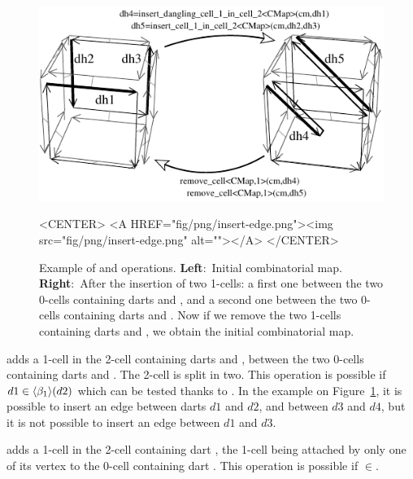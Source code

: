 \begin{figure}[htb]
  \begin{ccTexOnly}
    \begin{center}
      \includegraphics[width=.72\textwidth]{Combinatorial_map/fig/pdf/insert-edge}
    \end{center}
  \end{ccTexOnly}
  \begin{ccHtmlOnly}
    <CENTER> <A HREF="fig/png/insert-edge.png"><img
    src="fig/png/insert-edge.png" alt=""></A> </CENTER>
  \end{ccHtmlOnly}
  \caption{Example of  and
     operations. \textbf{Left}:~Initial
    combinatorial map.  \textbf{Right}:~After the insertion of two
    1-cells: a first one between the two 0-cells containing darts
     and , and a second one between the two 0-cells
    containing darts  and . Now if we remove the two
    1-cells containing darts  and , we obtain the
    initial combinatorial map.}
  \label{fig-insert-edge}
\end{figure}
{} adds a 1-cell in
the 2-cell containing darts  and , between the two
0-cells containing darts  and . The 2-cell is split
in two. This operation is possible if $d1 \in \langle{}\beta_1\rangle{}(d2)$
which can be tested thanks to
.  In the example on
Figure~\ref{fig-insert-edge}, it is possible to insert an edge
between darts $d1$ and $d2$, and between $d3$ and $d4$, but it is
not possible to insert an edge between $d1$ and $d3$.

{} adds a 1-cell in
the 2-cell containing dart , the 1-cell being attached by only
one of its vertex to the 0-cell containing dart .
This operation is possible if $\in$.

